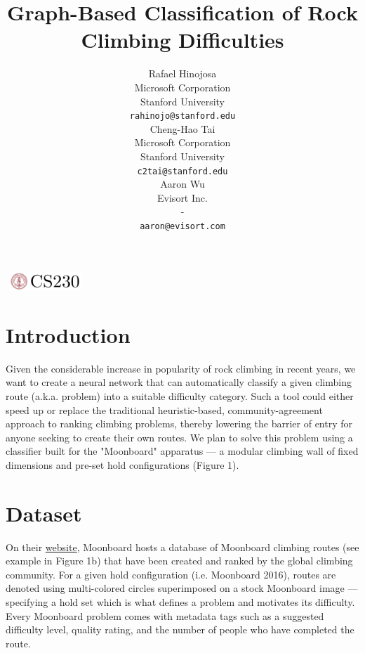\documentclass{article}
\title{Graph-Based Classification of Rock Climbing Difficulties}
\author{
  Rafael Hinojosa \\
  Microsoft Corporation \\
  Stanford University \\
  \texttt{rahinojo@stanford.edu} \\ 
  \And
  Cheng-Hao Tai \\
  Microsoft Corporation \\
  Stanford University \\
  \texttt{c2tai@stanford.edu} \\
  \And
  Aaron Wu \\
  Evisort Inc. \\
  - \\
  \texttt{aaron@evisort.com} \\
}
\begin{document}

\begin{center}
\includegraphics[width=3cm, height=0.7cm]{CS230}
\end{center}

\maketitle

\section{Introduction}	
Given the considerable increase in popularity of rock climbing in recent years, we want to create a neural network that can automatically classify a given climbing route (a.k.a. problem) into a suitable difficulty category. Such a tool could either speed up or replace the traditional heuristic-based, community-agreement approach to ranking climbing problems, thereby lowering the barrier of entry for anyone seeking to create their own routes. We plan to solve this problem using a classifier built for the "Moonboard" apparatus --- a modular climbing wall of fixed dimensions and pre-set hold configurations (Figure 1). 

\section{Dataset}
On their \href{https://moonboard.com/}{website}, Moonboard hosts a database of Moonboard climbing routes (see example in Figure 1b) that have been created and ranked by the global climbing community. For a given hold configuration (i.e. Moonboard 2016), routes are denoted using multi-colored circles superimposed on a stock Moonboard image --- specifying a hold set which is what defines a problem and motivates its difficulty. Every Moonboard problem comes with metadata tags such as a suggested difficulty level, quality rating, and the number of people who have completed the route. 
\end{document}
